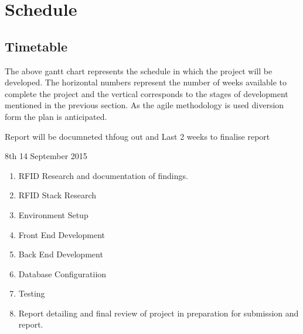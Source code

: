 \documentclass[a4paper, 11pt]{article}
\begin{document}


\section{Schedule}



  \begin{gantt}{10}{12}
    \begin{ganttitle}
    \end{ganttitle}
  \end{gantt}
  

\subsection{Timetable}

The above gantt chart represents the schedule in which the project will be developed. The horizontal numbers represent the number of weeks available to complete the project and the vertical corresponds to the stages of development mentioned in the previous section. As the agile methodology is used diversion form the plan is anticipated. 

Report will be documneted thfoug out and 
Last 2 weeks to finalise report

8th 14 September 2015
\vspace{\baselineskip}

\begin{enumerate}
	\item RFID Research and documentation of findings.
	\item RFID Stack Research
	\item Environment Setup
	\item Front End Development
	\item Back End Development
	\item Database Configuratiion
	\item Testing
	\item Report detailing and final review of project in preparation for submission and report.
 \end{enumerate}
\end{document}
